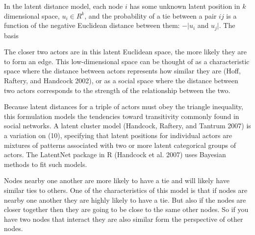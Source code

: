 In the latent distance model, each node $i$ has some unknown latent position in $k$ dimensional space, $u_{i} \in R^{k}$, and the probability of a tie between a pair $ij$ is a function of the negative Euclidean distance between them: $-|u_{i}$ and $u_{j}|$. The basis 

The closer two actors are in this latent Euclidean space, the more likely they are to form an edge. This low-dimensional space can be thought of as a characteristic space where the distance between actors represents how similar they are (Hoff, Raftery, and Handcock 2002), or as a social space where the distance between two actors corresponds to the strength of the relationship between the two.

Because latent distances for a triple of actors must obey the triangle inequality, this formulation models the tendencies toward transitivity commonly found in social networks. A latent cluster model (Handcock, Raftery, and Tantrum 2007) is a variation on (10), specifying that latent positions for individual actors are mixtures of patterns associated with two or more latent categorical groups of actors. The LatentNet package in R (Handcock et al. 2007) uses Bayesian methods to fit such models.

Nodes nearby one another are more likely to have a tie and will likely have similar ties to others. One of the characteristics of this model is that if nodes are nearby one another they are highly likely to have a tie. But also if the nodes are closer together then they are going to be close to the same other nodes. So if you have two nodes that interact they are also similar form the perspective of other nodes. 



